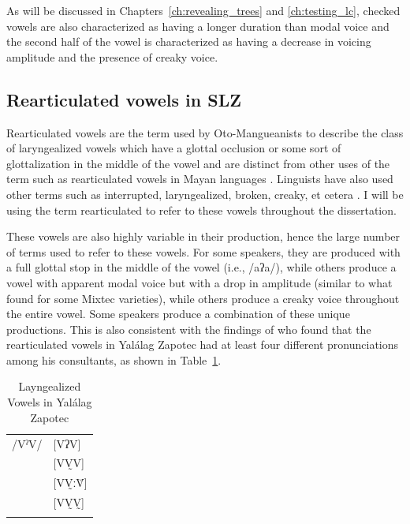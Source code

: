 As will be discussed in Chapters~\ref{ch:revealing_trees} and \ref{ch:testing_lc}, checked vowels are also characterized as having a longer duration than modal voice and the second half of the vowel is characterized as having a decrease in voicing amplitude and the presence of creaky voice.
\subsection{Rearticulated vowels in SLZ} \label{sec:SLZ-voicequality-rearticulated}
Rearticulated vowels are the term used by Oto-Mangueanists to describe the class of laryngealized vowels which have a glottal occlusion or some sort of glottalization in the middle of the vowel \citep{ariza-garciaPhonationTypesTones2018} and are distinct from other uses of the term such as rearticulated vowels in Mayan languages \citep{bairdPhoneticPhonologicalRealizations2011}. Linguists have also used other terms such as interrupted, laryngealized, broken, creaky, et cetera \citep{adlerAcousticsPhonationTypes2016,ariza-garciaPhonationTypesTones2018,avelinoAcousticElectroglottographicAnalyses2010,longDiccionarioZapotecoSan2005,sonnenscheinDescriptiveGrammarSan2005}. I will be using the term rearticulated to refer to these vowels throughout the dissertation.

These vowels are also highly variable in their production, hence the large number of terms used to refer to these vowels. For some speakers, they are produced with a full glottal stop in the middle of the vowel (i.e., /aʔa/), while others produce a vowel with apparent modal voice but with a drop in amplitude (similar to what \cite{gerfenProductionPerceptionLaryngealized2005} found for some Mixtec varieties), while others produce a creaky voice throughout the entire vowel. Some speakers produce a combination of these unique productions. This is also consistent with the findings of \citet{avelinoAcousticElectroglottographicAnalyses2010} who found that the rearticulated vowels in Yalálag Zapotec had at least four different pronunciations among his consultants, as shown in Table~\ref{tab:yalalag_laryngeal}. 

\begin{table}[!h]
	\centering
	\caption{Layngealized Vowels in Yalálag Zapotec}
	\label{tab:yalalag_laryngeal}
	 \begin{tabular}{ll}
	\lsptoprule
	/VˀV/	&  [VʔV]  \\
			&  [VV̰V]   \\
			&  [VV̰ːV̆]  \\
			&  [VV̰V̰]	\\
	\lspbottomrule
	\end{tabular}
\end{table}


